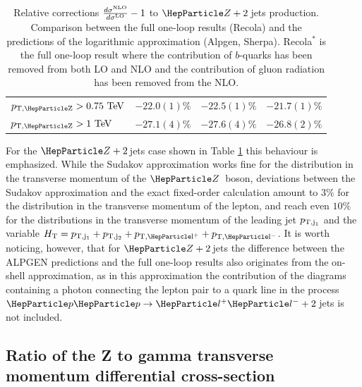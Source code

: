 \documentclass[11pt]{cernrep}
\begin{document}
\begin{table}
{\begin{tabular}{l|c|c|c}
$p_{\rm T,\PZ}>0.75\UTeV$ & $-22.0(1)\%$   & $-22.5(1)\%$   & $-21.7(1)\%$  \\
$p_{\rm T,\PZ}>1\UTeV$    & $-27.1(4)\%$   & $-27.6(4)\%$   & $-26.8(2)\%$  \\
\hline
\hline
\end{tabular}
}
\caption{ \label{tabelz2j} Relative corrections $\frac{d \sigma^{\rm
      NLO}}{d \sigma^{\rm LO}}-1$ to $\PZ+2\,$jets production. Comparison
  between the full one-loop results ({\sc Recola}) and the predictions
  of  the logarithmic approximation ({\sc Alpgen}, {\sc Sherpa}). 
{\sc Recola}$^{*}$ is the full one-loop result where the contribution 
of $b$-quarks has been removed from  both LO and NLO and the
contribution of gluon radiation has been removed from the NLO. }
\end{table}
%
%
For the $\PZ+2$\,jets case shown in Table \ref{tabelz2j} this
behaviour is emphasized. While the Sudakov approximation works fine
for the distribution in the transverse momentum of the $\PZ$~boson,
deviations between the Sudakov approximation
and the exact fixed-order calculation amount to $3\%$ for the
distribution in the  transverse momentum of the lepton, and reach even
$10\%$ for the distributions in the transverse momentum of the leading jet
$p_{\rm T, j_1}$ and the variable $H_{\rm T}=p_{\rm T, j_1}+p_{\rm T,j_2}+p_{\rm T,\Pl^+}+p_{\rm T,\Pl^-}$.
It is worth noticing, however, that for
$\PZ+2\,$jets the difference between the {\sc ALPGEN} predictions and
the full one-loop results also originates from the on-shell
approximation, as in this approximation the contribution of the
diagrams containing a photon connecting the lepton pair to a quark
line in the process $\Pp\Pp \to \Pl^+\Pl^-+2\,$jets is not included.



\subsection{Ratio of the Z to gamma transverse momentum differential
  cross-section}
\end{document}
